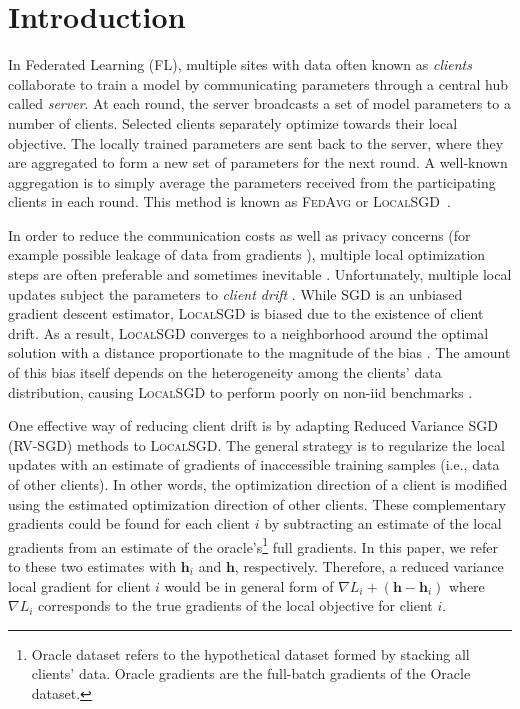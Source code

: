 \documentclass[runningheads]{llncs}
\def\vh{{\bm{h}}}
\newcommand{\fedavg}{\textsc{FedAvg}\xspace}
\newcommand{\localsgd}{\textsc{LocalSGD}\xspace}
\newcommand{\sgd}{\textsc{SGD}\xspace}
\newcommand{\rvsgd}{\textsc{RV-SGD}\xspace}
\begin{document}
\section{Introduction}
In Federated Learning (FL), multiple sites with data often known as \emph{clients} collaborate to train a model by communicating parameters through a central hub called \emph{server}. 
At each round, the server broadcasts a set of model parameters to a number of clients.
Selected clients separately optimize towards their local objective.
The locally trained parameters are sent back to the server, where they are aggregated to form a new set of parameters for the next round.
A well-known aggregation is to simply average the parameters received from the participating clients in each round.
This method is known as 
\fedavg \cite{mcmahan2017communication} or \localsgd~\cite{stich2018local}.


In order to reduce the communication costs as well as privacy concerns (for example possible leakage of data from gradients \cite{zhu2020deep}), multiple local optimization steps are often preferable and sometimes inevitable \cite{mcmahan2017communication}.
Unfortunately, multiple local updates subject the parameters to \emph{client drift} \cite{karimireddy2020scaffold}. While \sgd is an unbiased gradient descent estimator,
\localsgd is biased due to the existence of client drift.
As a result, \localsgd converges to a neighborhood around the optimal solution with a distance proportionate to the magnitude of the bias \cite{ajalloeian2020convergence}. 
The amount of this bias itself depends on the heterogeneity among the clients' data distribution, causing \localsgd to perform poorly on non-iid benchmarks \cite{zhao2018federated}.



One effective way of reducing client drift is by adapting Reduced Variance SGD (\rvsgd) methods \cite{johnson2013accelerating,roux2012stochastic,shalev2013stochastic,nguyen2017sarah} to \localsgd.
The general strategy is to regularize the local updates with an estimate of gradients of inaccessible training samples (i.e., data of other clients).
In other words, the optimization direction of a client is modified using the estimated optimization direction of other clients.
These complementary gradients could be found for each client $i$ by subtracting an estimate of the local gradients from an estimate of the oracle's\footnote{Oracle dataset refers to the hypothetical dataset formed by stacking all clients' data.
Oracle gradients are the full-batch gradients of the Oracle dataset.} full gradients.
In this paper, we refer to these two estimates with $\vh_i$ and $\vh$, respectively.
Therefore, a reduced variance local gradient for client $i$ would be in general form of $\nabla L_i + (\vh - \vh_i)$ where $\nabla L_i$ corresponds to the true gradients of the local objective for client $i$. 
\end{document}
